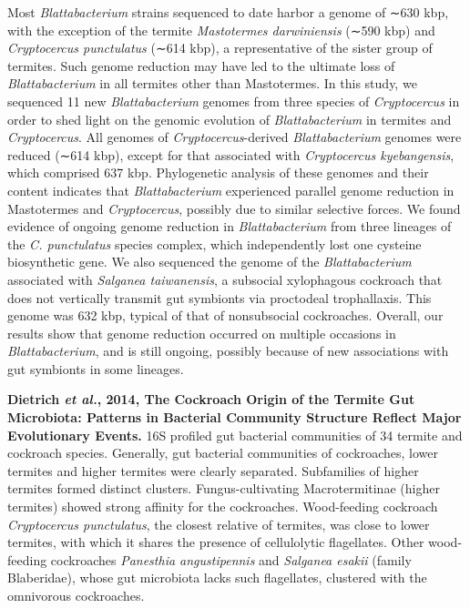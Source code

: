 \documentclass[11pt]{article}
\begin{document}
\begin{sloppypar}
Most \textit{Blattabacterium} strains sequenced to date harbor a genome of ∼630 kbp, with the exception of the termite \textit{Mastotermes darwiniensis} (∼590 kbp) and \textit{Cryptocercus punctulatus} (∼614 kbp), a representative of the sister group of termites. 
Such genome reduction may have led to the ultimate loss of \textit{Blattabacterium} in all termites other than Mastotermes. 
In this study, we sequenced 11 new \textit{Blattabacterium} genomes from three species of \textit{Cryptocercus} in order to shed light on the genomic evolution of \textit{Blattabacterium} in termites and \textit{Cryptocercus}. 
All genomes of \textit{Cryptocercus}-derived \textit{Blattabacterium} genomes were reduced (∼614 kbp), except for that associated with \textit{Cryptocercus kyebangensis}, which comprised 637 kbp. 
Phylogenetic analysis of these genomes and their content indicates that \textit{Blattabacterium} experienced parallel genome reduction in Mastotermes and \textit{Cryptocercus}, possibly due to similar selective forces. 
We found evidence of ongoing genome reduction in \textit{Blattabacterium} from three lineages of the \textit{C. punctulatus} species complex, which independently lost one cysteine biosynthetic gene. 
We also sequenced the genome of the \textit{Blattabacterium} associated with \textit{Salganea taiwanensis}, a subsocial xylophagous cockroach that does not vertically transmit gut symbionts via proctodeal trophallaxis. 
This genome was 632 kbp, typical of that of nonsubsocial cockroaches. 
Overall, our results show that genome reduction occurred on multiple occasions in \textit{Blattabacterium}, and is still ongoing, possibly because of new associations with gut symbionts in some lineages.
\par
\textbf{Dietrich \textit{et al.}, 2014, The Cockroach Origin of the Termite Gut Microbiota: Patterns in Bacterial Community Structure Reflect Major Evolutionary Events.} \newline
16S profiled gut bacterial communities of 34 termite and cockroach species. 
Generally, gut bacterial communities of cockroaches, lower termites and higher termites were clearly separated. 
Subfamilies of higher termites formed distinct clusters. 
Fungus-cultivating Macrotermitinae (higher termites) showed strong affinity for the cockroaches.
Wood-feeding cockroach \textit{Cryptocercus punctulatus}, the closest relative of termites, was close to lower termites, with which it shares the presence of cellulolytic flagellates. 
Other wood-feeding cockroaches \textit{Panesthia angustipennis} and \textit{Salganea esakii} (family Blaberidae), whose gut microbiota lacks such flagellates, clustered with the omnivorous cockroaches. 

\end{sloppypar}
\end{document}
